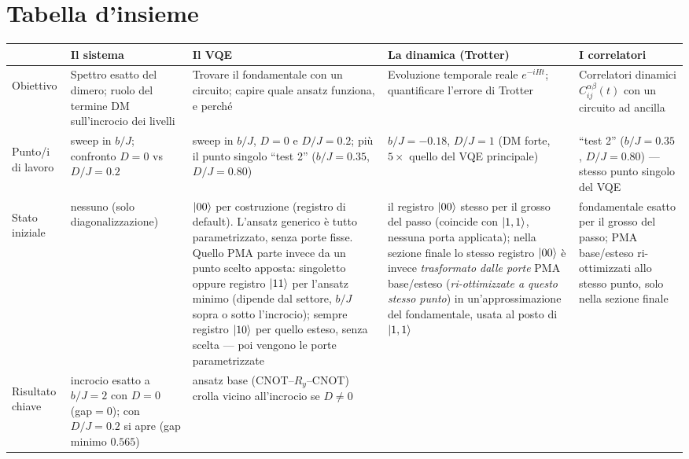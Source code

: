 \documentclass[11pt,a4paper]{article}
\begin{document}
\section{Tabella d'insieme}

\renewcommand{\arraystretch}{1.35}
\begin{landscape}
\thispagestyle{empty}
\begin{center}
\small
\setlength{\tabcolsep}{4pt}
\begin{tabular}{@{}>{\bfseries\raggedright}p{2.7cm} p{5.15cm} p{5.15cm} p{5.15cm} p{5.15cm}@{}}
\toprule
\rowcolor{grigetto}
 & \textbf{Il sistema} & \textbf{Il VQE} & \textbf{La dinamica (Trotter)} & \textbf{I correlatori} \\
\midrule
Obiettivo &
Spettro esatto del dimero; ruolo del termine DM sull'incrocio dei livelli &
Trovare il fondamentale con un circuito; capire quale ansatz funziona, e
perché &
Evoluzione temporale reale $e^{-iHt}$; quantificare l'errore di Trotter &
Correlatori dinamici $C_{ij}^{\alpha\beta}(t)$ con un circuito ad ancilla \\
\addlinespace
Punto/i di lavoro &
sweep in $b/J$; confronto $D=0$ vs $D/J=0.2$ &
sweep in $b/J$, $D=0$ e $D/J=0.2$; più il punto singolo ``test 2''
($b/J{=}0.35$, $D/J{=}0.80$) &
$b/J=-0.18$, $D/J=1$ (DM forte, $5\times$ quello del VQE principale) &
``test 2'' ($b/J{=}0.35$, $D/J{=}0.80$) --- stesso punto singolo del VQE \\
\addlinespace
Stato iniziale &
nessuno (solo diagonalizzazione) &
$\lvert 00\rangle$ per costruzione (registro di default). L'ansatz generico è
tutto parametrizzato, senza porte fisse. Quello PMA parte invece da un
punto scelto apposta: singoletto oppure registro $\lvert 11\rangle$ per l'ansatz
minimo (dipende dal settore, $b/J$ sopra o sotto l'incrocio); sempre
registro $\lvert 10\rangle$ per quello esteso, senza scelta --- poi vengono le
porte parametrizzate &
il registro $\lvert 00\rangle$ stesso per il grosso del passo (coincide con
$\lvert 1,1\rangle$, nessuna porta applicata); nella sezione finale lo stesso
registro $\lvert 00\rangle$ è invece \emph{trasformato dalle porte} PMA
base/esteso (\emph{ri-ottimizzate a questo stesso punto}) in
un'approssimazione del fondamentale, usata al posto di $\lvert 1,1\rangle$ &
fondamentale esatto per il grosso del passo; PMA base/esteso
ri-ottimizzati allo stesso punto, solo nella sezione finale \\
\addlinespace
Risultato chiave &
incrocio esatto a $b/J=2$ con $D=0$ (gap$=0$); con $D/J=0.2$ si apre
(gap minimo $0.565$) &
ansatz base (CNOT--$R_y$--CNOT) crolla vicino all'incrocio se $D\neq0$

\end{tabular}
\end{center}
\end{landscape}
\end{document}
